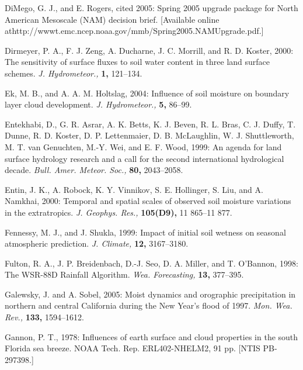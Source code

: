 \documentclass[twocolumn]{article}
\begin{document}
\begin{references}
{\item DiMego, G. J., and E. Rogers, cited 2005: Spring 2005 upgrade package for North American Mesoscale (NAM) decision brief. [Available online at\newline http://wwwt.emc.ncep.noaa.gov/mmb/Spring2005.NAMUpgrade.pdf.]

\item Dirmeyer, P. A., F. J. Zeng, A. Ducharne, J. C. Morrill, and R. D. Koster, 2000: The sensitivity of surface fluxes to soil water content in three land surface schemes. \textit{J. Hydrometeor.,} \textbf{1,} 121--134.

\item Ek, M. B., and A. A. M. Holtslag, 2004: Influence of soil moisture on boundary layer cloud development. \textit{J. Hydrometeor.,} \textbf{5,} 86--99.

\item Entekhabi, D., G. R. Asrar, A. K. Betts, K. J. Beven, R. L. Bras, C. J. Duffy, T. Dunne, R. D. Koster, D. P. Lettenmaier, D. B. McLaughlin, W. J. Shuttleworth, M. T. van Genuchten, M.-Y. Wei, and E. F. Wood, 1999: An agenda for land surface hydrology research and a call for the second international hydrological decade. \textit{Bull. Amer. Meteor. Soc.,} \textbf{80,} 2043--2058.

\item Entin, J. K., A. Robock, K. Y. Vinnikov, S. E. Hollinger, S. Liu, and A. Namkhai, 2000: Temporal and spatial scales of observed soil moisture variations in the extratropics. \textit{J. Geophys. Res.,} \textbf{105(D9),} 11 865--11 877.

\item Fennessy, M. J., and J. Shukla, 1999: Impact of initial soil wetness on seasonal atmospheric prediction. \textit{J. Climate,} \textbf{12,} 3167--3180.

\item Fulton, R. A., J. P. Breidenbach, D.-J. Seo, D. A. Miller, and T. O'Bannon, 1998: The WSR-88D Rainfall Algorithm. \textit{Wea. Forecasting,} \textbf{13,} 377--395.

\item Galewsky, J. and A. Sobel, 2005: Moist dynamics and orographic precipitation in northern and central California during the New Year's flood of 1997. \textit{Mon. Wea. Rev.,} \textbf{133,} 1594--1612.

\item Gannon, P. T., 1978: Influences of earth surface and cloud properties in the south Florida sea breeze. NOAA Tech. Rep. ERL402-NHELM2, 91 pp. [NTIS PB-297398.]

}
\end{references}
\end{document}

